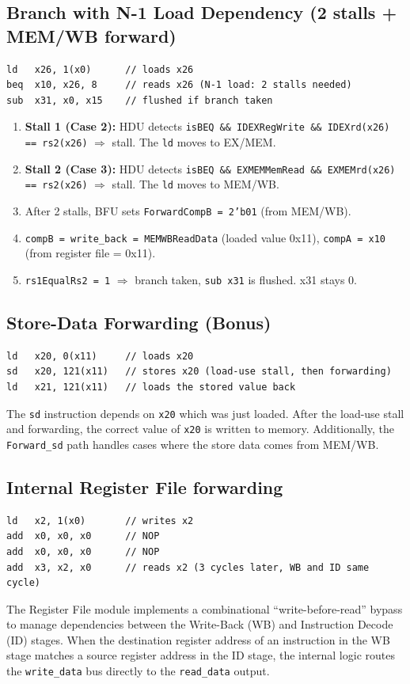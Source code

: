 \documentclass[12pt,a4paper]{article}
\begin{document}
\subsection{Branch with N-1 Load Dependency (2 stalls + MEM/WB forward)}
\begin{lstlisting}[style=verilog, numbers=none]
ld   x26, 1(x0)      // loads x26
beq  x10, x26, 8     // reads x26 (N-1 load: 2 stalls needed)
sub  x31, x0, x15    // flushed if branch taken
\end{lstlisting}
\begin{enumerate}
    \item \textbf{Stall 1 (Case 2):} HDU detects \texttt{isBEQ \&\& IDEXRegWrite \&\& IDEXrd(x26) == rs2(x26)} $\Rightarrow$ stall. The \texttt{ld} moves to EX/MEM.
    \item \textbf{Stall 2 (Case 3):} HDU detects \texttt{isBEQ \&\& EXMEMMemRead \&\& EXMEMrd(x26) == rs2(x26)} $\Rightarrow$ stall. The \texttt{ld} moves to MEM/WB.
    \item After 2 stalls, BFU sets \texttt{ForwardCompB = 2'b01} (from MEM/WB).
    \item \texttt{compB = write\_back = MEMWBReadData} (loaded value 0x11), \texttt{compA = x10} (from register file = 0x11).
    \item \texttt{rs1EqualRs2 = 1} $\Rightarrow$ branch taken, \texttt{sub x31} is flushed. x31 stays 0.
\end{enumerate}

\subsection{Store-Data Forwarding (Bonus)}
\begin{lstlisting}[style=verilog, numbers=none]
ld   x20, 0(x11)     // loads x20
sd   x20, 121(x11)   // stores x20 (load-use stall, then forwarding)
ld   x21, 121(x11)   // loads the stored value back
\end{lstlisting}
The \texttt{sd} instruction depends on \texttt{x20} which was just loaded. After the load-use stall and forwarding, the correct value of \texttt{x20} is written to memory. Additionally, the \texttt{Forward\_sd} path handles cases where the store data comes from MEM/WB.

\subsection{Internal Register File forwarding}
\begin{lstlisting}[style=verilog, numbers=none]
ld   x2, 1(x0)       // writes x2
add  x0, x0, x0      // NOP
add  x0, x0, x0      // NOP
add  x3, x2, x0      // reads x2 (3 cycles later, WB and ID same cycle)
\end{lstlisting}
The Register File module implements a combinational ``write-before-read'' bypass to manage dependencies between the Write-Back (WB) and Instruction Decode (ID) stages. When the destination register address of an instruction in the WB stage matches a source register address in the ID stage, the internal logic routes the \texttt{write\_data} bus directly to the \texttt{read\_data} output. 
\end{document}
